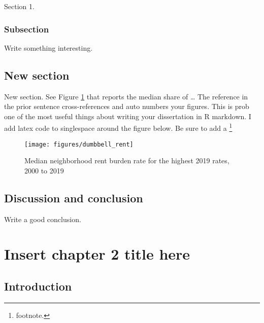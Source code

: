 \documentclass[
]{DissertateCUNY}
\begin{document}
Section 1.

\hypertarget{subsection}{%
\subsection{Subsection}\label{subsection}}

Write something interesting.

\hypertarget{new-section}{%
\section{New section}\label{new-section}}

New section. See Figure \ref{fig:dumbbellrent} that reports the median
share of \ldots{} The reference in the prior sentence cross-references
and auto numbers your figures. This is prob one of the most useful
things about writing your dissertation in R markdown. I add latex code
to singlespace around the figure below. Be sure to add a \footnote{footnote.}

\begin{singlespace}
\begin{figure}

{\centering \texttt{[image: figures/dumbbell\_rent]} 

}

\caption{Median neighborhood rent burden rate for the highest 2019 rates, 2000 to 2019}\label{fig:dumbbellrent}
\end{figure}
\end{singlespace}

\hypertarget{discussion-and-conclusion}{%
\section{Discussion and conclusion}\label{discussion-and-conclusion}}

Write a good conclusion.

\FloatBarrier

\newpage
{}
\fancyhead[R]{\thepage}
\fancyfoot[C]{}

\chapter{Insert chapter 2 title here}

\doublespacing

\hypertarget{introduction-1}{%
\section{Introduction}\label{introduction-1}}
\end{document}
